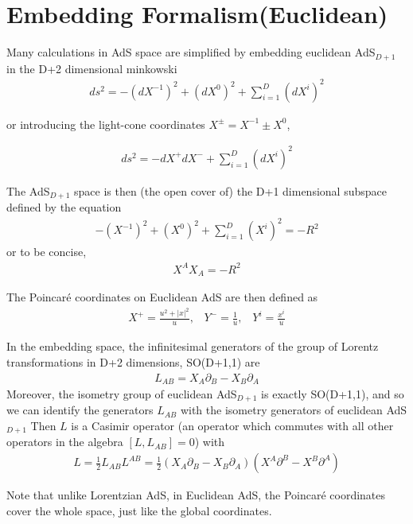 \section{Embedding Formalism(Euclidean)}
Many calculations in AdS space are simplified by embedding euclidean AdS$_{D+1}$ in the D+2 dimensional minkowski
\begin{align}
 ds^2 = -(dX^{-1})^2 +(dX^{0})^2+\sum_{i=1}^D (dX^i)^2
\end{align}

or introducing the light-cone coordinates $X^\pm = X^{-1} \pm X^0$,

\begin{align}
 ds^2 = -dX^+dX^-+\sum_{i=1}^D (dX^i)^2
\end{align}

The AdS$_{D+1}$ space is then (the open cover of) the D+1 dimensional subspace defined by the equation
\begin{align}
 -(X^{-1})^2 +(X^0)^2+\sum_{i=1}^D (X^i)^2 = -R^2
\end{align}
or to be concise,
\begin{align}
 X^A X_A = -R^2 \label{embedads}
\end{align}

The Poincar\'{e} coordinates on Euclidean AdS are then defined as 
\begin{align}
 X^+ = \frac{u^2 + |x|^2}{u}, \;\;\; Y^- = \frac{1}{u}, \;\;\; Y^i = \frac{x^i}{u}
\end{align}


In the embedding space, the infinitesimal generators of the group of Lorentz transformations in D+2 dimensions, SO(D+1,1) are 
\begin{align}
 L_{AB} = X_A \partial_B - X_B \partial_A
\end{align}
Moreover, the isometry group of euclidean AdS$_{D+1}$ is exactly SO(D+1,1), and so we can identify the generators $L_{AB}$ with the isometry generators of euclidean AdS$_{D+1}$
Then $L$ is a Casimir operator (an operator which commutes with all other operators in the algebra $[L,L_{AB}]=0$) with
\begin{align}
 L=\frac{1}{2} L_{AB}L^{AB} = \frac{1}{2}\left(X_A \partial_B - X_B \partial_A\right)\left(X^A \partial^B - X^B \partial^A\right)
\end{align}



Note that unlike Lorentzian AdS, in Euclidean AdS, the Poincar\'{e} coordinates cover the whole space, just like the global coordinates.

